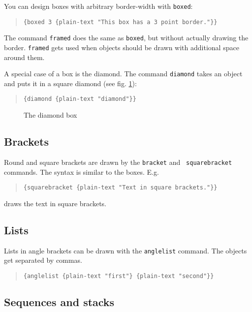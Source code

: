 You can design boxes with arbitrary border-width with {\tt boxed}:

\begin{quote}
\verb'{boxed 3 {plain-text "This box has a 3 point border."}}'
\end{quote}

The command {\tt framed} does the same as {\tt boxed}, but without
actually drawing the border. {\tt framed} gets used when objects should
be drawn with additional space around them.

A special case of a box is the diamond. The command {\tt diamond}
takes an object and puts it in a square diamond (see fig. \ref{diamond}):

\begin{quote}
\verb'{diamond {plain-text "diamond"}}'
\end{quote}

\begin{figure}[hb]
\begin{center}
\leavevmode
{}
\caption{The diamond box}
\label{diamond}
\end{center}
\end{figure}

\subsection{Brackets}

Round and square brackets are drawn by the {\tt bracket} and {\tt
squarebracket} commands. The syntax is similar to the boxes. E.g.

\begin{quote}
\verb'{squarebracket {plain-text "Text in square brackets."}}'
\end{quote}

draws the text in square brackets.

\subsection{Lists}

Lists in angle brackets can be drawn with the {\tt anglelist} command.
The objects get separated by commas.

\begin{quote}
\verb'{anglelist {plain-text "first"} {plain-text "second"}}'
\end{quote}

\subsection{Sequences and stacks}

